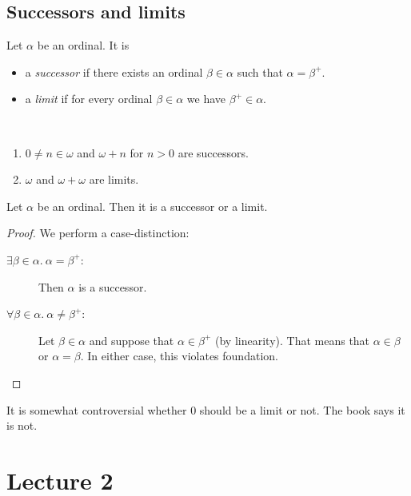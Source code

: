 \documentclass{whrartcl}
\begin{document}
\subsection{Successors and limits}

\begin{definition}
  Let $\alpha$ be an ordinal. It is
  \begin{itemize}
  \item a \emph{successor} if there exists an ordinal $\beta \in \alpha$ such that $\alpha
    = \beta^+$.
  \item a \emph{limit} if for every ordinal $\beta \in \alpha$ we have $\beta^+
    \in \alpha$.
  \end{itemize}
\end{definition}

\begin{example}
  \
  \begin{enumerate}
  \item $0 \neq n \in \omega$ and $\omega + n$ for $n > 0$ are successors.
  \item $\omega$ and $\omega + \omega$ are limits.
  \end{enumerate}
\end{example}

\begin{theorem}
  Let $\alpha$ be an ordinal. Then it is a successor or a limit.
\end{theorem}
\begin{proof}
  We perform a case-distinction:
  \begin{description}
  \item[$\exists \beta \in \alpha.~\alpha = \beta^+$:] Then $\alpha$ is a successor.
  \item[$\forall \beta \in \alpha.~\alpha \neq \beta^+$:] Let $\beta \in \alpha$
    and suppose that $\alpha \in \beta^+$ (by linearity). That means that
    $\alpha \in \beta$ or $\alpha = \beta$. In either case, this violates foundation.
  \end{description}
\end{proof}

\begin{remark}
  It is somewhat controversial whether $0$ should be a limit or not. The book
  says it is not.
\end{remark}


\newpage

\section{Lecture 2}
\end{document}
